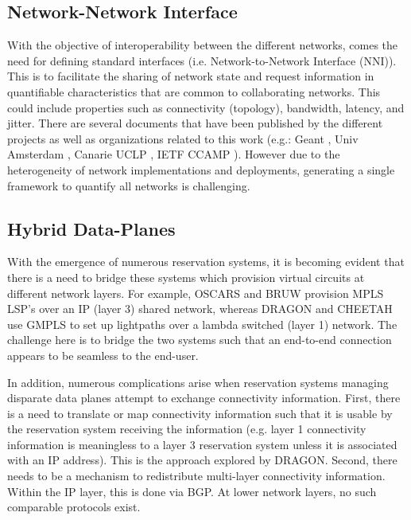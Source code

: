 \documentclass[conference]{IEEEtran}
\begin{document}
\subsection{Network-Network Interface}
With the objective of interoperability between the different networks,
comes the need for defining standard interfaces (i.e. Network-to-Network
Interface (NNI)).  This is to facilitate the sharing of network state and
request information in quantifiable characteristics that are common to
collaborating networks.  This could include properties such as connectivity
(topology), bandwidth, latency, and jitter.  There are several documents
that have been published by the different projects as well as organizations
related to this work (e.g.: Geant \cite{GEANT},  Univ Amsterdam \cite{ndl}, 
Canarie UCLP \cite{canarie-interop}, IETF CCAMP \cite{ietf-ccamp}). However 
due to the
heterogeneity of network implementations and deployments, generating a single
framework to quantify all networks is challenging.

\subsection{Hybrid Data-Planes}
With the emergence of numerous reservation systems, it is becoming evident 
that there is a need to bridge these systems which provision virtual circuits 
at different network layers.
For example, OSCARS and BRUW provision MPLS LSP's over an IP (layer 3) shared 
network, whereas DRAGON and CHEETAH use
GMPLS to set up lightpaths over a lambda switched (layer 1) network.
The challenge here is to bridge the two systems such
that an end-to-end connection appears to be seamless to the end-user.

In addition, numerous complications arise when reservation systems managing 
disparate data planes attempt to exchange connectivity information.  First, 
there is a need to translate or map connectivity information such that it is 
usable by the reservation system receiving the information (e.g. layer 1 
connectivity information is meaningless to a layer 3 reservation system unless 
it is associated with an IP address).  This is the approach explored by DRAGON.
Second, there needs to be a mechanism to redistribute multi-layer connectivity 
information. Within the IP layer, this is done via BGP.  At lower network 
layers, no such comparable protocols exist.

\end{document}
